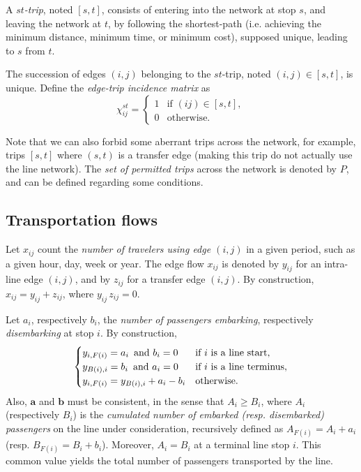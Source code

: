 \documentclass{bmcart}
\begin{document}
A \emph{$st$-trip}, noted $[s,t]$, consists of entering into the network at stop $s$, and leaving the network at $t$, by following the shortest-path (i.e. achieving the minimum distance,  minimum time, or  minimum cost), supposed unique, leading to $s$ from $t$.

The succession of edges $(i, j)$ belonging to the $st$-trip, noted $(i,j)\in [s,t]$, is unique. Define the \emph{edge-trip incidence matrix} as
\begin{equation}
\label{edgetrip}
\chi_{ij}^{st} = \begin{cases}
  1    & \text{if $(ij)\in [s,t]$}, \\
  0    & \text{otherwise}.
\end{cases}
\end{equation}

Note that we can also forbid some aberrant trips across the network, for example, trips $[s, t]$ where $(s, t)$ is a transfer edge (making this trip do not actually use the line network). The \emph{set of permitted trips} across the network is denoted by $P$, and can be defined regarding some conditions.

\vspace*{0.1cm}

\subsection{Transportation flows}
\label{Transportation flows}
Let  $x_{ij}$ count the \emph{number of travelers using edge $(i,j)$} in a given period, such as a given hour, day, week or  year.  The edge flow $x_{ij}$ is denoted by $y_{ij}$ for an intra-line edge $(i,j)$, and 
by $z_{ij}$ for a transfer edge $(i,j)$. By construction, $x_{ij}=y_{ij}+z_{ij}$, where $y_{ij}\,  z_{ij}=0$. 

\vspace*{0.1cm}


Let $a_i$, respectively $b_i$, the \emph{number of passengers embarking}, respectively \emph{disembarking} at stop $i$. By construction, 
\begin{equation}
\label{bilan1ligne}
\begin{cases}
 y_{i,F(i)}=a_i \text{\,  and } b_i=0   & \text{if $i$ is a line start}, \\
y_{B(i),i}=b_i \text{\,  and } a_i=0   & \text{if $i$ is a line terminus}, \\
 y_{i,F(i)}=y_{B(i),i}+a_i-b_i     & \text{otherwise}.
\end{cases}
\end{equation}
Also, $\mathbf{a}$ and $\mathbf{b}$ must be consistent, in the sense that $A_i\ge B_i$, where $A_i$ (respectively $B_i$) is the \emph{cumulated number of embarked 
(resp. disembarked) passengers} on the line under consideration, recursively defined as $A_{F(i)}=A_i+a_i$ (resp. $B_{F(i)}=B_i+b_i$). Moreover,  $A_i=B_i$ at a terminal line stop $i$. This common value yields  the total number of passengers transported by the line. 
\end{document}
